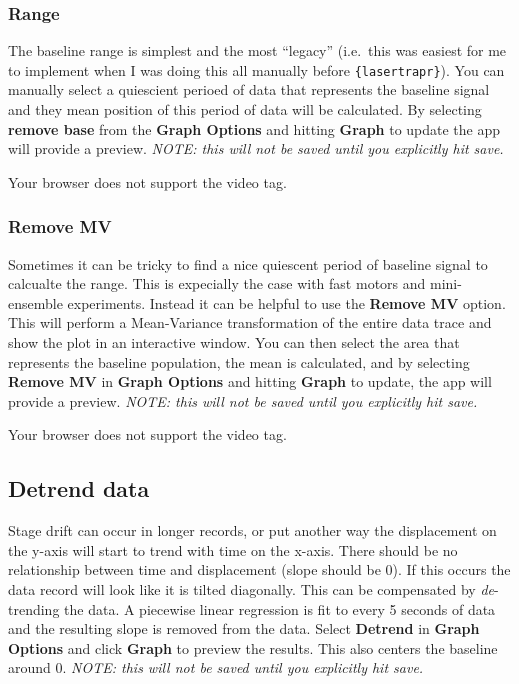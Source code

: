 \documentclass[
]{book}
\begin{document}
\subsubsection{Range}\label{range}

The baseline range is simplest and the most ``legacy'' (i.e.~this was easiest for me to implement when I was doing this all manually before \texttt{\{lasertrapr\}}). You can manually select a quiescient perioed of data that represents the baseline signal and they mean position of this period of data will be calculated. By selecting \textbf{remove base} from the \textbf{Graph Options} and hitting \textbf{Graph} to update the app will provide a preview. \emph{NOTE: this will not be saved until you explicitly hit save.}

Your browser does not support the video tag.

\subsubsection{Remove MV}\label{remove-mv}

Sometimes it can be tricky to find a nice quiescent period of baseline signal to calcualte the range. This is expecially the case with fast motors and mini-ensemble experiments. Instead it can be helpful to use the \textbf{Remove MV} option. This will perform a Mean-Variance transformation of the entire data trace and show the plot in an interactive window. You can then select the area that represents the baseline population, the mean is calculated, and by selecting \textbf{Remove MV} in \textbf{Graph Options} and hitting \textbf{Graph} to update, the app will provide a preview. \emph{NOTE: this will not be saved until you explicitly hit save.}

Your browser does not support the video tag.

\subsection{Detrend data}\label{detrend-data}

Stage drift can occur in longer records, or put another way the displacement on the y-axis will start to trend with time on the x-axis. There should be no relationship between time and displacement (slope should be 0). If this occurs the data record will look like it is tilted diagonally. This can be compensated by \emph{de}-trending the data. A piecewise linear regression is fit to every 5 seconds of data and the resulting slope is removed from the data. Select \textbf{Detrend} in \textbf{Graph Options} and click \textbf{Graph} to preview the results. This also centers the baseline around 0. \emph{NOTE: this will not be saved until you explicitly hit save.}
\end{document}
